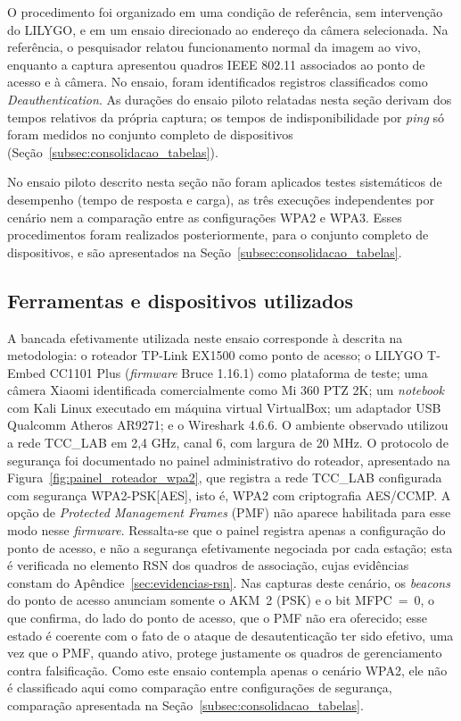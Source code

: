 O procedimento foi organizado em uma condição de referência, sem intervenção do LILYGO, e em um ensaio direcionado ao endereço da câmera selecionada. Na referência, o pesquisador relatou funcionamento normal da imagem ao vivo, enquanto a captura apresentou quadros IEEE 802.11 associados ao ponto de acesso e à câmera. No ensaio, foram identificados registros classificados como \textit{Deauthentication}. As durações do ensaio piloto relatadas nesta seção derivam dos tempos relativos da própria captura; os tempos de indisponibilidade por \textit{ping} só foram medidos no conjunto completo de dispositivos (Seção~\ref{subsec:consolidacao_tabelas}).

No ensaio piloto descrito nesta seção não foram aplicados testes sistemáticos de desempenho (tempo de resposta e carga), as três execuções independentes por cenário nem a comparação entre as configurações WPA2 e WPA3. Esses procedimentos foram realizados posteriormente, para o conjunto completo de dispositivos, e são apresentados na Seção~\ref{subsec:consolidacao_tabelas}.

\subsection{Ferramentas e dispositivos utilizados}

A bancada efetivamente utilizada neste ensaio corresponde à descrita na metodologia: o roteador TP-Link EX1500 como ponto de acesso; o LILYGO T-Embed CC1101 Plus (\textit{firmware} Bruce 1.16.1) como plataforma de teste; uma câmera Xiaomi identificada comercialmente como Mi 360 PTZ 2K; um \textit{notebook} com Kali Linux executado em máquina virtual VirtualBox; um adaptador USB Qualcomm Atheros AR9271; e o Wireshark 4.6.6. O ambiente observado utilizou a rede TCC\_LAB em 2,4 GHz, canal 6, com largura de 20 MHz. O protocolo de segurança foi documentado no painel administrativo do roteador, apresentado na Figura~\ref{fig:painel_roteador_wpa2}, que registra a rede TCC\_LAB configurada com segurança WPA2-PSK[AES], isto é, WPA2 com criptografia AES/CCMP. A opção de \textit{Protected Management Frames} (PMF) não aparece habilitada para esse modo nesse \textit{firmware}. Ressalta-se que o painel registra apenas a configuração do ponto de acesso, e não a segurança efetivamente negociada por cada estação; esta é verificada no elemento RSN dos quadros de associação, cujas evidências constam do Apêndice~\ref{sec:evidencias-rsn}. Nas capturas deste cenário, os \textit{beacons} do ponto de acesso anunciam somente o AKM~2 (PSK) e o bit MFPC~=~0, o que confirma, do lado do ponto de acesso, que o PMF não era oferecido; esse estado é coerente com o fato de o ataque de desautenticação ter sido efetivo, uma vez que o PMF, quando ativo, protege justamente os quadros de gerenciamento contra falsificação. Como este ensaio contempla apenas o cenário WPA2, ele não é classificado aqui como comparação entre configurações de segurança, comparação apresentada na Seção~\ref{subsec:consolidacao_tabelas}.

